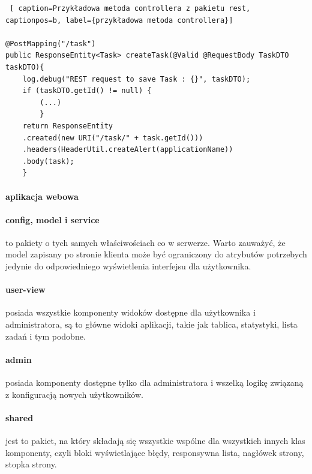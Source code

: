\begin{lstlisting} [ caption=Przykładowa metoda controllera z pakietu rest, captionpos=b, label={przykładowa metoda controllera}]

@PostMapping("/task")
public ResponseEntity<Task> createTask(@Valid @RequestBody TaskDTO taskDTO){
	log.debug("REST request to save Task : {}", taskDTO);
	if (taskDTO.getId() != null) {
		(...)
		}
	return ResponseEntity
	.created(new URI("/task/" + task.getId()))
	.headers(HeaderUtil.createAlert(applicationName))
	.body(task);
	}

\end{lstlisting}

\paragraph{aplikacja webowa}
\paragraph{config, model i service} to pakiety o tych samych właściwościach co w serwerze. Warto zauważyć, że model zapisany po stronie klienta może być ograniczony do atrybutów potrzebych jedynie do odpowiedniego wyświetlenia interfejsu dla użytkownika. 
\paragraph{user-view} posiada wszystkie komponenty widoków dostępne dla użytkownika i administratora, są to główne widoki aplikacji, takie jak tablica, statystyki, lista zadań i tym podobne.
\paragraph{admin} posiada komponenty dostępne tylko dla administratora i wszelką logikę związaną z konfiguracją nowych użytkowników.
\paragraph{shared} jest to pakiet, na który składają się wszystkie wspólne dla wszystkich innych klas komponenty, czyli bloki wyświetlające błędy, responsywna lista, nagłówek strony, stopka strony. 

